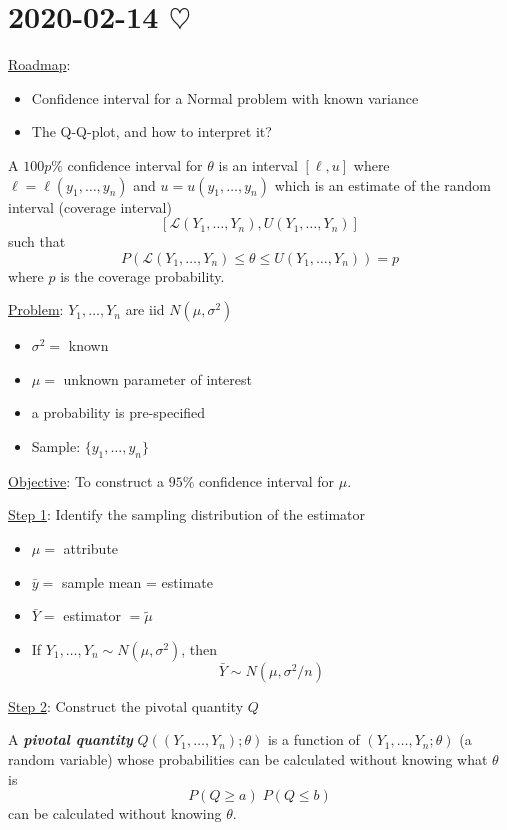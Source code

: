 \section{2020-02-14 \texorpdfstring{$\heartsuit$}{[Valentine's Day!]}}

\underline{Roadmap}:
\begin{itemize}
    \item Confidence interval for a Normal problem with known variance
    \item The Q-Q-plot, and how to interpret it?
\end{itemize}

\begin{Definition}{}{}
    A $ 100p\% $ confidence interval for $ \theta $ is an interval $
        [\ell,u] $ where $ \ell=\ell(y_1,\ldots ,y_n) $ and $ u=u(y_1,\ldots
        ,y_n) $ which is an estimate of the random interval (coverage interval)
    \[ \left[ \mathcal{L}(Y_1,\ldots ,Y_n),U(Y_1,\ldots ,Y_n) \right] \] such that
    \[ P\left( \mathcal{L}(Y_1,\ldots ,Y_n)\leqslant \theta\leqslant U(Y_1,\ldots
        ,Y_n) \right)=p \] where $ p $ is the coverage probability.
\end{Definition}

\underline{Problem}:  $ Y_1,\ldots ,Y_n $ are iid $ N(\mu,\sigma^2) $
\begin{itemize}
    \item $ \sigma^2= $ known
    \item $ \mu= $ unknown parameter of interest
    \item a probability is pre-specified
    \item Sample: $ \{y_1,\ldots ,y_n\} $
\end{itemize}
\underline{Objective}: To construct a $ 95\% $ confidence interval for $ \mu $.

\underline{Step 1}: Identify the sampling distribution of the estimator
\begin{itemize}
    \item $ \mu= $ attribute
    \item $ \bar{y}= $ sample mean = estimate
    \item $ \bar{Y}= $ estimator $ = \tilde{\mu} $
    \item If $ Y_1,\ldots ,Y_n \sim N(\mu,\sigma^2) $, then
          \[ \bar{Y} \sim N\left( \mu,\sigma^2/n \right) \]
\end{itemize}
\underline{Step 2}: Construct the pivotal quantity $ Q $

\begin{Definition}{}{}
    A \textbf{\emph{pivotal quantity}} $ Q((Y_1,\ldots ,Y_n);\theta) $ is a
    function of $ \left( Y_1,\ldots ,Y_n;\theta \right) $ (a random
    variable) whose probabilities can be calculated without knowing what $
        \theta $ is
    \[ P(Q\geqslant a)\; P(Q\leqslant b) \] can be calculated without
    knowing $ \theta $.
\end{Definition}

